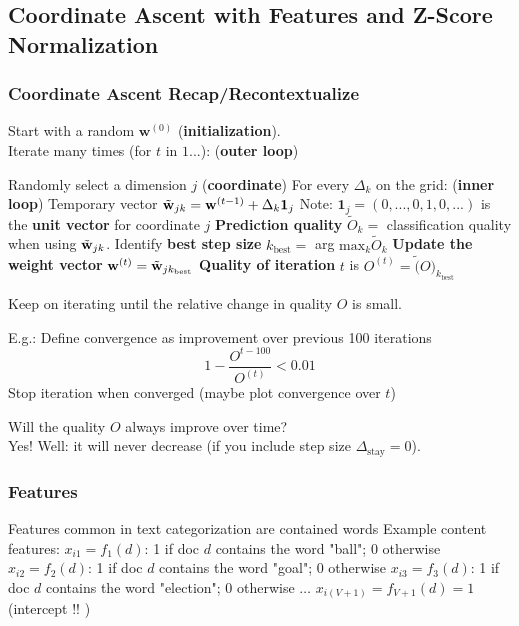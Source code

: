 \documentclass{article}
\renewcommand{\vec}[1]{%
	\mathbf{#1}%
}
\begin{document}
	\subsection{Coordinate Ascent with Features and Z-Score Normalization}
	\subsubsection{Coordinate Ascent Recap/Recontextualize}
	Start with a random $\vec{w}^{(0)}$ (\textbf{initialization}).\\
	Iterate many times (for $t$ in $1...$): (\textbf{outer loop})
	\begin{outline}
		\1 Randomly select a dimension $j$ (\textbf{coordinate})
		\2 For every $\Delta_k$ on the grid: (\textbf{inner loop})
		\3 Temporary vector $\tilde{\vec{w}}_{jk} = \vec{w}^{(t-1)} + \Delta_k\vec{1}_j$
		\3 Note: $\vec{1}_j = (0,...,0,1,0,...)$ is the \textbf{unit vector} for coordinate $j$
		\3 \textbf{Prediction quality} $\tilde{O}_k =$ classification quality when using $\tilde{\vec{w}}_{jk}$.
		\2 Identify \textbf{best step size} $k_{\text{best}} =$ arg $\text{max}_k \tilde{O}_k$
		\2 \textbf{Update the weight vector} $\vec{w}^{(t)} = \tilde{\vec{w}}_{jk_{\text{best}}}$
		\2 \textbf{Quality of iteration} $t$ is $O^{(t)} = \tilde(O)_{k_{\text{best}}}$
	\end{outline}
	Keep on iterating until the relative change in quality $O$ is small.
	\begin{outline}
		\1 E.g.: Define convergence as improvement over previous 100 iterations
		\begin{equation*}
			1 - \frac{O^{t - 100}}{O^{(t)}} < 0.01
		\end{equation*}	
		\1 Stop iteration when converged (maybe plot convergence over $t$)
	\end{outline}
	Will the quality $O$ always improve over time?\\
	Yes! Well: it will never decrease (if you include step size $\Delta_{\text{stay}} = 0$).
	\subsubsection{Features}
	\begin{outline}
		\1 Features common in text categorization are contained words
		\1 Example content features:
		\2[] $x_{i1} = f_1(d)$: 1 if doc $d$ contains the word "ball"; 0 otherwise
		\2[] $x_{i2} = f_2(d)$: 1 if doc $d$ contains the word "goal"; 0 otherwise
		\2[] $x_{i3} = f_3(d)$: 1 if doc $d$ contains the word "election"; 0 otherwise
		\2[] $\dots$
		\2[] $x_{i(V+1)} = f_{V+1}(d) = 1$ (intercept !! )
	\end{outline}
\end{document}
